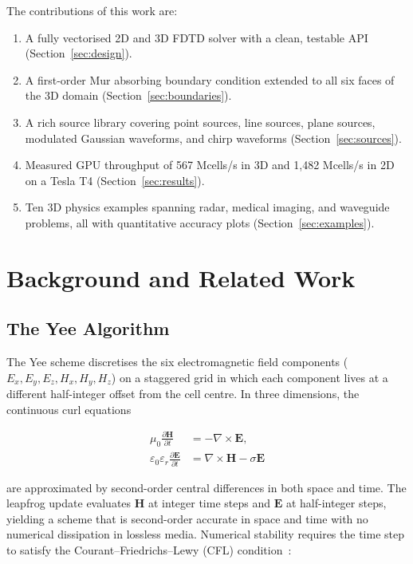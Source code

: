 \documentclass[10pt,twocolumn]{article}
\begin{document}
The contributions of this work are:
\begin{enumerate}
  \item A fully vectorised 2D and 3D FDTD solver with a clean, testable API
        (Section~\ref{sec:design}).
  \item A first-order Mur absorbing boundary condition extended to all six
        faces of the 3D domain (Section~\ref{sec:boundaries}).
  \item A rich source library covering point sources, line sources, plane
        sources, modulated Gaussian waveforms, and chirp waveforms
        (Section~\ref{sec:sources}).
  \item Measured GPU throughput of 567 Mcells/s in 3D and 1{,}482 Mcells/s
        in 2D on a Tesla T4 (Section~\ref{sec:results}).
  \item Ten 3D physics examples spanning radar, medical imaging, and waveguide
        problems, all with quantitative accuracy plots
        (Section~\ref{sec:examples}).
\end{enumerate}

\section{Background and Related Work}
\label{sec:related}

\subsection{The Yee Algorithm}

The Yee scheme discretises the six electromagnetic field components
($E_x, E_y, E_z, H_x, H_y, H_z$) on a staggered grid in which each component
lives at a different half-integer offset from the cell centre. In three
dimensions, the continuous curl equations

\begin{align}
  \mu_0 \frac{\partial \mathbf{H}}{\partial t} &= -\nabla \times \mathbf{E},
  \label{eq:faraday}\\
  \varepsilon_0 \varepsilon_r \frac{\partial \mathbf{E}}{\partial t} &=
    \nabla \times \mathbf{H} - \sigma \mathbf{E}
  \label{eq:ampere}
\end{align}

are approximated by second-order central differences in both space and time.
The leapfrog update evaluates $\mathbf{H}$ at integer time steps and
$\mathbf{E}$ at half-integer steps, yielding a scheme that is second-order
accurate in space and time with no numerical dissipation in lossless media.
Numerical stability requires the time step to satisfy the Courant--Friedrichs--Lewy
(CFL) condition~\cite{taflove2005computational}:
\end{document}
